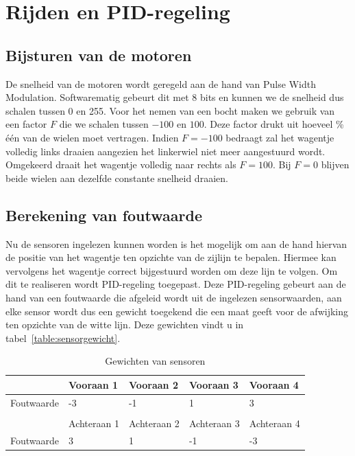 \section{Rijden en PID-regeling}
\subsection{Bijsturen van de motoren}
De snelheid van de motoren wordt geregeld aan de hand van Pulse Width Modulation. Softwarematig gebeurt dit met 8 bits en kunnen we de snelheid dus schalen tussen 0 en 255. Voor het nemen van een bocht maken we gebruik van een factor $F$ die we schalen tussen $-100$ en $100$. Deze factor drukt uit hoeveel \% \'e\'en van de wielen moet vertragen. Indien $F=-100$ bedraagt zal het wagentje volledig links draaien aangezien het linkerwiel niet meer aangestuurd wordt. Omgekeerd draait het wagentje volledig naar rechts als $F = 100$. Bij $F=0$ blijven beide wielen aan dezelfde constante snelheid draaien.
\subsection{Berekening van foutwaarde}
Nu de sensoren ingelezen kunnen worden is het mogelijk om aan de hand hiervan de positie van het wagentje ten opzichte van de zijlijn te bepalen.
Hiermee kan vervolgens het wagentje correct bijgestuurd worden om deze lijn te volgen. Om dit te realiseren wordt PID-regeling toegepast.
Deze PID-regeling gebeurt aan de hand van een foutwaarde die afgeleid wordt uit de ingelezen sensorwaarden, aan elke sensor wordt dus een gewicht toegekend die een maat geeft voor de afwijking ten opzichte van de witte lijn. Deze gewichten vindt u in tabel~\vref{table:sensorgewicht}.

\begin{table}[H]
	\centering
	\begin{tabular}{lllll}
		\hline
		\multicolumn{1}{|l|}{}           & \multicolumn{1}{l|}{Vooraan 1}   & \multicolumn{1}{l|}{Vooraan 2}   & \multicolumn{1}{l|}{Vooraan 3}   & \multicolumn{1}{l|}{Vooraan 4}   \\ \hline
		\multicolumn{1}{|l|}{Foutwaarde} & \multicolumn{1}{l|}{-3}          & \multicolumn{1}{l|}{-1}          & \multicolumn{1}{l|}{1}           & \multicolumn{1}{l|}{3}           \\ \hline
		&                                  &                                  &                                  &                                  \\ \hline
		\multicolumn{1}{|l|}{}           & \multicolumn{1}{l|}{Achteraan 1} & \multicolumn{1}{l|}{Achteraan 2} & \multicolumn{1}{l|}{Achteraan 3} & \multicolumn{1}{l|}{Achteraan 4} \\ \hline
		\multicolumn{1}{|l|}{Foutwaarde} & \multicolumn{1}{l|}{3}           & \multicolumn{1}{l|}{1}           & \multicolumn{1}{l|}{-1}          & \multicolumn{1}{l|}{-3}           \\ \hline
	\end{tabular}
	\caption{Gewichten van sensoren}
	\label{table:sensorgewicht}
\end{table}

